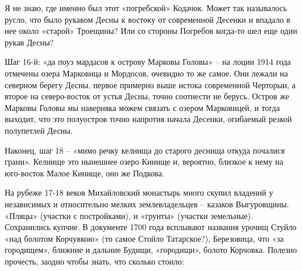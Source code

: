Я не знаю, где именно был этот «погребской» Кодачок. Может так называлось русло, что было рукавом Десны к востоку от современной Десенки и впадало в нее около «старой» Троещины? Или со стороны Погребов когда-то шел еще один рукав Десны?


Шаг 16-й: «да поуз мардасов к острову Марковы Головы» – на лоции 1914 года отмечены озера Марковица и Мордосов, очевидно то же самое. Они лежали на северном берегу Десны, первое примерно выше истока современной Черторыи, а второе на северо-восток от устья Десны, точно соотнести не берусь. Остров же Марковы Головы мы наверняка можем связать с озером Марковицей, и тогда выходит, что это полуостров точно напротив начала Десенки, огибаемый резкой полупетлей Десны.

Наконец, шаг 18 – «мимо речку келнища до старого деснища откуда почалися грани». Келнище это нынешнее озеро Кинище и, вероятно, близкое к нему на юго-восток Малое Кинище, оно же Подкова. 

На рубеже 17-18 веков Михайловский монастырь много скупил владений у независимых и относительно мелких землевладельцев – казаков Выгуровщины. «Пляцы» (участки с постройками), и «грунты» (участки земельные). Сохранились купчие. В документе 1700 года всплывают названия урочищ Стуйло «над болотом Корчувкою» (то самое Стойло Татарское?), Березовица, что «за городищем», ближние и дальние Будищи, «городищи», болото Корчовка. Полезно прочесть, заодно чтобы знать, что сколько стоило\cite{mihdocs}:

